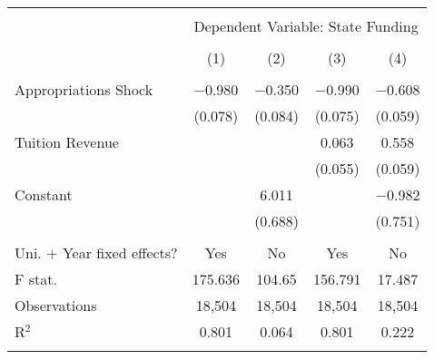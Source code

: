 
\begin{tabular}{@{\extracolsep{5pt}}lcccc} 
\\[-1.8ex]\hline 
\hline \\[-1.8ex] 
 & \multicolumn{4}{c}{Dependent Variable: State Funding} \\ 
\cline{2-5} 
\\[-1.8ex] & (1) & (2) & (3) & (4)\\ 
\hline \\[-1.8ex] 
 Appropriations Shock & $-$0.980 & $-$0.350 & $-$0.990 & $-$0.608 \\ 
  & (0.078) & (0.084) & (0.075) & (0.059) \\ 
  Tuition Revenue &  &  & 0.063 & 0.558 \\ 
  &  &  & (0.055) & (0.059) \\ 
  Constant &  & 6.011 &  & $-$0.982 \\ 
  &  & (0.688) &  & (0.751) \\ 
 \hline \\[-1.8ex] 
Uni. + Year fixed effects? & Yes & No & Yes & No \\ 
F stat. & 175.636 & 104.65 & 156.791 & 17.487 \\ 
Observations & 18,504 & 18,504 & 18,504 & 18,504 \\ 
R$^{2}$ & 0.801 & 0.064 & 0.801 & 0.222 \\ 
\hline 
\hline \\[-1.8ex] 
\end{tabular} 
